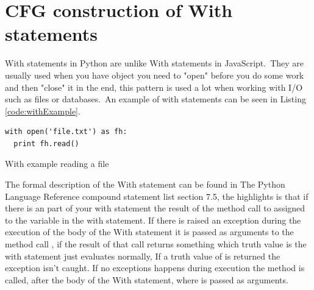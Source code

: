 \section{CFG construction of With statements}
With statements in Python are unlike With statements in JavaScript.\ They are usually used when you have object you need to "open" before you do some work and then "close" it in the end, this pattern is used a lot when working with I/O such as files or databases.\ An example of with statements can be seen in Listing \ref{code:withExample}.

\begin{listing}[H]
  \begin{verbatim}
with open('file.txt') as fh:
  print fh.read()
  \end{verbatim}
  \caption{With example reading a file}\label{code:withExample}
\end{listing}

The formal description of the With statement can be found in The Python Language Reference compound statement list\cite{pyref.compound} section 7.5, 
the highlights is that if there is an  part of your with statement the result of the method call to  
assigned to the variable in the with statement. If there is raised an exception during the execution of the body of the With statement it is 
passed as arguments to the method call , if the result of that call returns something which truth value is  
the with statement just evaluates normally, If a truth value of  is returned the exception isn't caught. 
If no exceptions happens during execution the  method is called, after the body of the With statement, 
where  is passed as arguments.